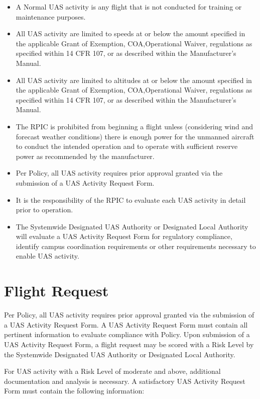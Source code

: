 \documentclass[
]{book}
\providecommand{\tightlist}{%
  \setlength{\itemsep}{0pt}\setlength{\parskip}{0pt}}
\begin{document}
\begin{itemize}
\tightlist
\item
  A Normal UAS activity is any flight that is not conducted for training or maintenance purposes.
\item
  All UAS activity are limited to speeds at or below the amount specified in the applicable Grant of Exemption, COA,Operational Waiver, regulations as specified within 14 CFR 107, or as described within the Manufacturer's Manual.
\item
  All UAS activity are limited to altitudes at or below the amount specified in the applicable Grant of Exemption, COA,Operational Waiver, regulations as specified within 14 CFR 107, or as described within the Manufacturer's Manual.
\item
  The RPIC is prohibited from beginning a flight unless (considering wind and forecast weather conditions) there is enough power for the unmanned aircraft to conduct the intended operation and to operate with sufficient reserve power as recommended by the manufacturer.
\item
  Per Policy, all UAS activity requires prior approval granted via the submission of a UAS Activity Request Form.
\item
  It is the responsibility of the RPIC to evaluate each UAS activity in detail prior to operation.
\item
  The Systemwide Designated UAS Authority or Designated Local Authority will evaluate a UAS Activity Request Form for regulatory compliance, identify campus coordination requirements or other requirements necessary to enable UAS activity.
\end{itemize}

\hypertarget{flight-request}{%
\section{Flight Request}\label{flight-request}}

Per Policy, all UAS activity requires prior approval granted via the submission of a UAS Activity Request Form. A UAS Activity Request Form must contain all pertinent information to evaluate compliance with Policy. Upon submission of a UAS Activity Request Form, a flight request may be scored with a Risk Level by the Systemwide Designated UAS Authority or Designated Local Authority.

For UAS activity with a Risk Level of moderate and above, additional documentation and analysis is necessary. A satisfactory UAS Activity Request Form must contain the following information:
\end{document}
